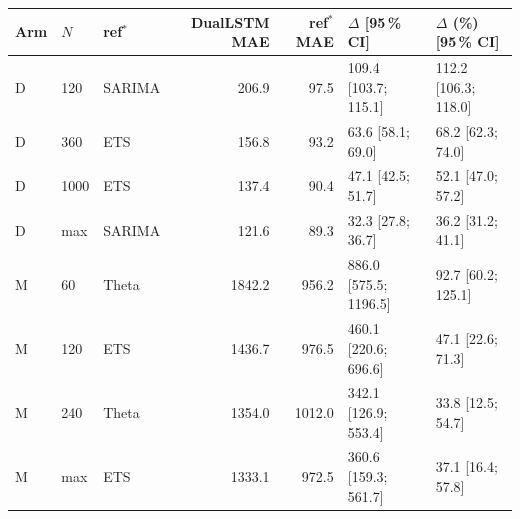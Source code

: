 \begin{tabular}{lllrrll}
\toprule
Arm & $N$ & ref$^*$ & DualLSTM MAE & ref$^*$ MAE & $\Delta$ [95\,\% CI] & $\Delta$ (\%) [95\,\% CI] \\
\midrule
D & 120 & SARIMA & 206.9 & 97.5 & 109.4 [103.7; 115.1] & 112.2 [106.3; 118.0] \\
D & 360 & ETS & 156.8 & 93.2 & 63.6 [58.1; 69.0] & 68.2 [62.3; 74.0] \\
D & 1000 & ETS & 137.4 & 90.4 & 47.1 [42.5; 51.7] & 52.1 [47.0; 57.2] \\
D & max & SARIMA & 121.6 & 89.3 & 32.3 [27.8; 36.7] & 36.2 [31.2; 41.1] \\
M & 60 & Theta & 1842.2 & 956.2 & 886.0 [575.5; 1196.5] & 92.7 [60.2; 125.1] \\
M & 120 & ETS & 1436.7 & 976.5 & 460.1 [220.6; 696.6] & 47.1 [22.6; 71.3] \\
M & 240 & Theta & 1354.0 & 1012.0 & 342.1 [126.9; 553.4] & 33.8 [12.5; 54.7] \\
M & max & ETS & 1333.1 & 972.5 & 360.6 [159.3; 561.7] & 37.1 [16.4; 57.8] \\
\bottomrule
\end{tabular}
